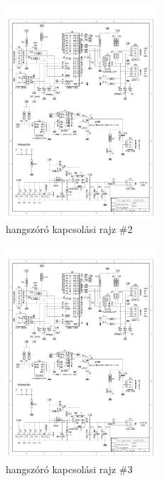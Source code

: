 \documentclass[tocnopagenum]{thesis-ekf}
\theoremstyle{definition}
\theoremstyle{remark}
\begin{document}
	\begin{figure}[h!]
		\centering
		\includegraphics[page=2,width=0.5\textwidth]{SLH}
		
		\caption{hangszóró kapcsolási rajz \#2}
		\label{fig:hangsz2}
	\end{figure}
	\begin{figure}[h!]
	
		\centering
		\includegraphics[page=3,width=0.5\textwidth]{SLH}
		
		\caption{hangszóró kapcsolási rajz \#3}
		\label{fig:hangsz3}\medskip
	\end{figure} 
\end{document}
